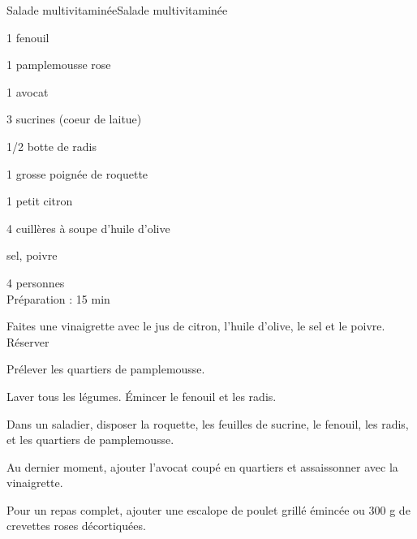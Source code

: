 \begin{recette}{Salade multivitaminée}{Salade multivitaminée}

\begin{ingredients}
 1 fenouil\par
 1 pamplemousse rose\par
 1 avocat\par
 3 sucrines (coeur de laitue)\par
 1/2 botte de radis\par
 1 grosse poignée de roquette\par
 1 petit citron\par
 4 cuillères à soupe d'huile d'olive\par
 sel, poivre
\end{ingredients}
\begin{infos}
 4 personnes	\\	%
 Préparation : 15 min\\		%
\end{infos}
\begin{etapes}
\item  Faites une vinaigrette avec le jus de citron, l'huile d'olive, le sel et le poivre. Réserver
\item Prélever les quartiers de pamplemousse.
\item Laver tous les légumes. Émincer le fenouil et les radis.
\item Dans un saladier, disposer la roquette, les feuilles de sucrine, le fenouil, les radis, et les quartiers de pamplemousse.
\item Au dernier moment, ajouter l'avocat coupé en quartiers et assaissonner avec la vinaigrette.
\item Pour un repas complet, ajouter une escalope de poulet grillé émincée ou 300 g de crevettes roses décortiquées.
\end{etapes}

\end{recette}